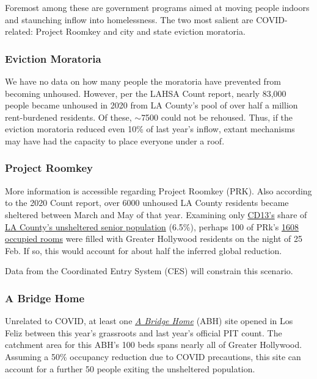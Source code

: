 \documentclass[11pt,twocolumn]{article}
\begin{document}
Foremost among these are government programs aimed at moving people indoors and staunching inflow into 
homelessness. The two most salient are COVID-related: Project Roomkey and city and state eviction moratoria.

\subsubsection{Eviction Moratoria}

We have no data on how many people the moratoria have prevented from becoming unhoused. However,
per the LAHSA Count report, nearly 83,000 people became unhoused in 2020 from LA County's pool 
of over half a million rent-burdened residents. Of these, $\sim$7500 could not be rehoused. Thus, if the eviction
moratoria reduced even 10\% of last year's inflow, extant mechanisms may have had the capacity to place 
everyone under a roof.

\subsubsection{Project Roomkey}

More information is accessible regarding Project Roomkey (PRK). Also according to the 2020 Count report, 
over 6000 unhoused LA County residents became sheltered between March and May of that year.
Examining only \href{https://www.lahsa.org/documents?id=4672-2020-homeless-count-council-district-13}
{CD13's} share of \href{https://www.lahsa.org/documents?id=4585-2020-greater-los-angeles-homeless-count-los-angeles-continuum-of-care-coc-}{LA County's unsheltered senior population} (6.5\%), perhaps 100 of PRk's 
\href{https://projectroomkeytracker.com/}{1608 occupied rooms} were filled with Greater Hollywood residents 
on the night of 25 Feb. If so, this would account for about half the inferred global reduction.

Data from the Coordinated Entry System (CES) will constrain this scenario.

\subsubsection{A Bridge Home}

Unrelated to COVID, at least one \href{https://www.lamayor.org/ABridgeHome}{\it A Bridge Home} (ABH) site 
opened in Los Feliz between this year's grassroots and last year's official PIT count. The catchment area for this ABH's
100 beds spans nearly all of Greater Hollywood. Assuming a 50\% occupancy reduction due to COVID precautions,
this site can account for a further 50 people exiting the unsheltered population.
\end{document}
